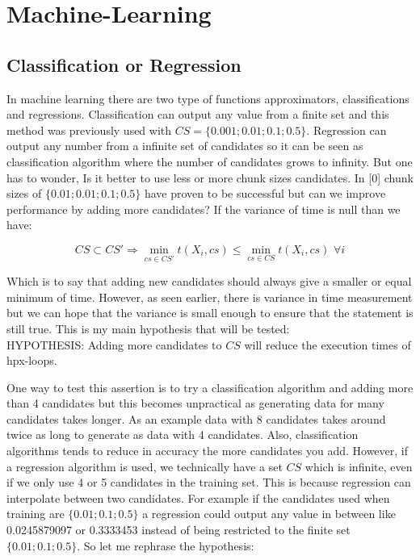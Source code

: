 \section{Machine-Learning}

\subsection{Classification or Regression}
In machine learning there are two type of functions approximators, classifications and regressions. Classification can output any value from a finite set and this method was previously used with $CS=\{0.001;0.01;0.1;0.5\}.$ Regression can output any number from a infinite set of candidates so it can be seen as classification algorithm where the number of candidates grows to infinity. But one has to wonder, Is it better to use less or more chunk sizes candidates. In [0] chunk sizes of $\{0.01;0.01;0.1;0.5\}$ have proven to be successful but can we improve performance by adding more candidates? If the variance of time is null than we have:

$$CS \subset CS' \Rightarrow \underset{cs \in CS'}{\min}t(X_i,cs)\leq \underset{cs \in CS}{\min}t(X_i,cs) \, \, \forall i$$

Which is to say that adding new candidates should always give a smaller or equal minimum of time. However, as seen earlier, there is variance in time measurement but we can hope that the variance is small enough to ensure that the statement is still true. This is my main hypothesis that will be tested:\\

HYPOTHESIS: Adding more candidates to $CS$ will reduce the execution times of hpx-loops.


 One way to test this assertion is to try a classification algorithm and adding more than 4 candidates but this becomes unpractical as generating data for many candidates takes longer. As an example data with 8 candidates takes around twice as long to generate as data with 4 candidates. Also, classification algorithms tends to reduce in accuracy the more candidates you add. However, if a regression algorithm is used, we technically have a set $CS$ which is infinite, even if we only use  4 or 5 candidates in the training set. This is because regression can interpolate between two candidates. For example if the candidates used when training are $\{0.01;0.1;0.5\}$ a regression could output any value in between like 0.0245879097 or 0.3333453 instead of being restricted to the finite set $\{0.01;0.1;0.5\}$.
 So let me rephrase the hypothesis:
 
